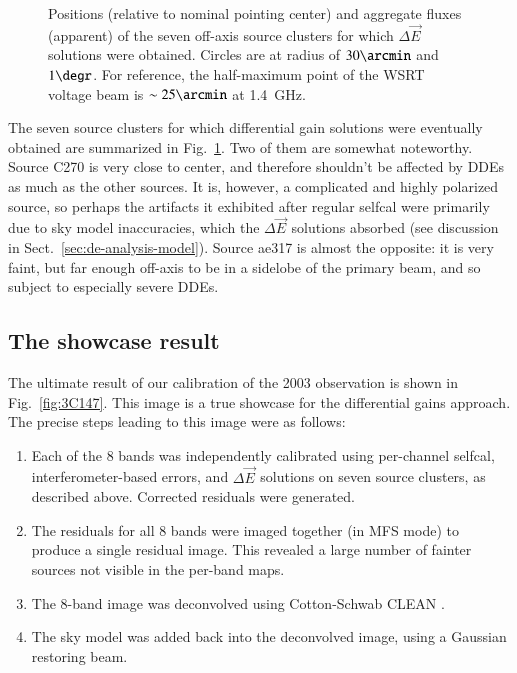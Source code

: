\documentclass[]{aa}
\newcommand{\jones}[2]{\vec {#1}_{#2}}
\begin{document}
\begin{figure}
\caption{\label{fig:source-plot}Positions (relative to nominal pointing center) and aggregate fluxes (apparent) of the seven off-axis source clusters for which $\Delta\jones{E}{}$ solutions were obtained. Circles are at  radius of $30\arcmin$ and $1\degr$. For reference, the half-maximum point of the WSRT voltage beam is $\sim25\arcmin$ at 1.4~GHz.}
\end{figure}

The seven source clusters for which differential gain solutions were eventually obtained are summarized in Fig.~\ref{fig:source-plot}. Two of them are somewhat noteworthy. Source C270 is very close to center, and therefore shouldn't be affected by DDEs as much as the other sources. It is, however, a complicated and highly polarized source, so perhaps the artifacts it exhibited after regular selfcal were primarily due to sky model inaccuracies, which the $\Delta\jones{E}{}$ solutions absorbed (see discussion in Sect.~\ref{sec:de-analysis-model}). Source ae317 is almost the opposite: it is very faint, but far enough off-axis to be in a sidelobe of the primary beam, and so subject to especially severe DDEs.

\subsection{The showcase result} 

The ultimate result of our calibration of the 2003 observation is shown in Fig.~\ref{fig:3C147}. This image is a true showcase for the differential gains approach. The precise steps leading to this image were as follows:

\begin{enumerate}

\item Each of the 8 bands was independently calibrated using per-channel selfcal, interferometer-based errors, and $\Delta\jones{E}{}$ solutions on seven source clusters, as described above. Corrected residuals were generated.

\item The residuals for all 8 bands were imaged together (in MFS mode) to produce a single residual image. This revealed a large number of fainter sources not visible in the per-band maps.

\item The 8-band image was deconvolved using Cotton-Schwab CLEAN \citep{Schwab:csclean}.

\item The sky model was added back into the deconvolved image, using a Gaussian restoring beam.

\end{enumerate}
\end{document}
